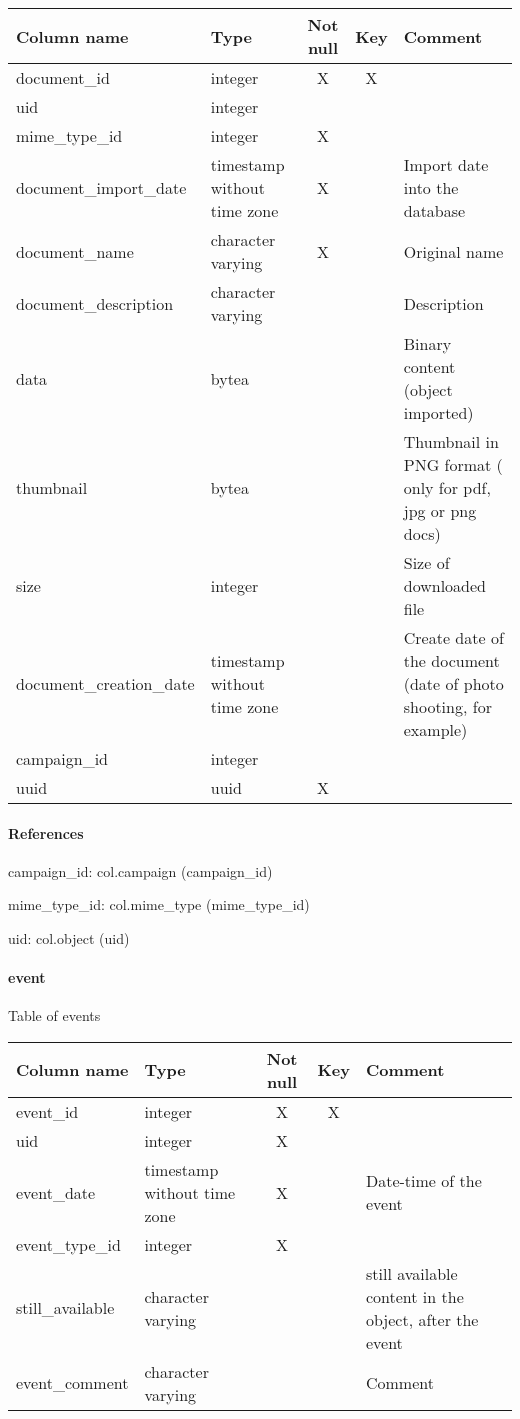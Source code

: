 \begin{tabular}{|l| p{2cm}|c|c| p{5cm}|}
\hline
Column name & Type & Not null & Key & Comment \\
\hline
document\_id & integer & X & X & \\
uid & integer &  &  & \\
mime\_type\_id & integer & X &  & \\
document\_import\_date & timestamp without time zone & X &  & Import date into the database\\
document\_name & character varying & X &  & Original name\\
document\_description & character varying &  &  & Description\\
data & bytea &  &  & Binary content (object imported)\\
thumbnail & bytea &  &  & Thumbnail in PNG format ( only for pdf, jpg or png docs)\\
size & integer &  &  & Size of downloaded file\\
document\_creation\_date & timestamp without time zone &  &  & Create date of the document (date of photo shooting, for example)\\
campaign\_id & integer &  &  & \\
uuid & uuid & X &  & \\
\hline
\end{tabular}
\paragraph{References}
campaign\_id: col.campaign (campaign\_id)

mime\_type\_id: col.mime\_type (mime\_type\_id)

uid: col.object (uid)

\paragraph{event}
Table of events

\begin{tabular}{|l| p{2cm}|c|c| p{5cm}|}
\hline
Column name & Type & Not null & Key & Comment \\
\hline
event\_id & integer & X & X & \\
uid & integer & X &  & \\
event\_date & timestamp without time zone & X &  & Date-time of the event\\
event\_type\_id & integer & X &  & \\
still\_available & character varying &  &  & still available content in the object, after the event\\
event\_comment & character varying &  &  & Comment\\
\hline
\end{tabular}
